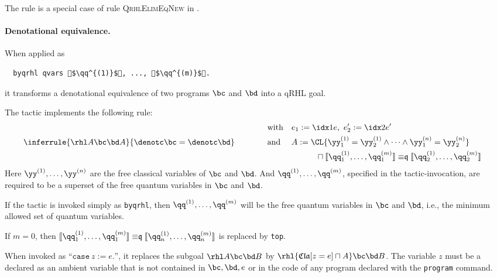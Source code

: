 \documentclass{article}
\renewcommand\ruleref[1]{rule \hbox{\textsc{#1}}}
\begin{document}
The rule is a special case of \ruleref{QrhlElimEqNew} in
\cite{local-variables}.

\paragraph{Denotational equivalence.}
When applied as
\begin{lstlisting}
  byqrhl qvars $\qq^{(1)}$, ..., $\qq^{(m)}$.
\end{lstlisting}
it transforms a denotational equivalence of two programs $\bc$ and $\bd$ into a qRHL goal.



The tactic implements the following rule:
\begin{align*}
\inferrule{
  \pb\rhl A
  \bc\bd
  A
}
{
  \denotc\bc = \denotc\bd
}
&
  \qquad\qquad
  \begin{aligned}
    &\text{with} && e_1 := \idx1e,\ e'_2 := \idx2e'
\\
&\text{and} &&  A := \CL{\yy^{(1)}_1=\yy^{(1)}_2\land\dots\land\yy^{(n)}_1=\yy^{(n)}_2}
\\
&&&\qquad\quad{}\sqcap
    \llbracket \qq_1^{(1)},\dots,\qq_1^{(m)} \rrbracket
    \mathrel{\mathord\equiv\mathfrak q}
    \llbracket \qq_2^{(1)},\dots,\qq_2^{(m)} \rrbracket
  \end{aligned}
\end{align*}
Here $\yy^{(1)},\dots,\yy^{(n)}$
are the free classical variables of $\bc$ and $\bd$.
And $\qq^{(1)},\dots,\qq^{(m)}$, specified in the tactic-invocation,
are required to be a superset of the free quantum variables in $\bc$ and $\bd$.


If the tactic is invoked simply as \texttt{byqrhl}, then $\qq^{(1)},\dots,\qq^{(m)}$ will be the free quantum variables in $\bc$ and $\bd$, i.e., the minimum allowed set of quantum variables.

If $m=0$, then $\llbracket \qq_1^{(1)},\dots,\qq_1^{(m)} \rrbracket
\mathrel{\mathord\equiv\mathfrak q} \llbracket
\qq_n^{(1)},\dots,\qq_n^{(m)} \rrbracket$ is replaced by \texttt{top}.



When invoked as ``$\mathtt{case}\ z := e\mathtt{.}$'',
it replaces the subgoal $\rhl A\bc\bd B$
by $\rhl{\mathfrak{Cla}[z=e]\sqcap A}\bc\bd B$.
The variable $z$
must be a declared as an ambient variable that is not contained in
$\bc,\bd,e$
or in the code of any program declared with the \texttt{program} command.
\end{document}
